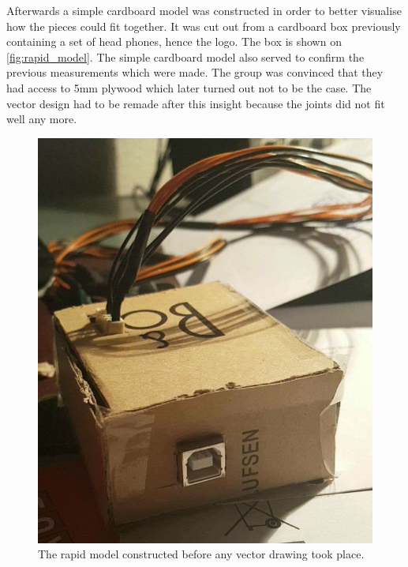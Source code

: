 Afterwards a simple cardboard model was constructed in order to better visualise how the pieces could fit together. It was cut out from a cardboard box previously containing a set of head phones, hence the logo. The box is shown on \autoref{fig:rapid_model}. The simple cardboard model also served to confirm the previous measurements which were made. The group was convinced that they had access to 5mm plywood which later turned out not to be the case. The vector design had to be remade after this insight because the joints did not fit well any more. 


\begin{figure}
\centering
\includegraphics[scale=0.75]{Figure/rapid_model.png}
\caption{The rapid model constructed before any vector drawing took place.}
\label{fig:hinge}
\end{figure}
